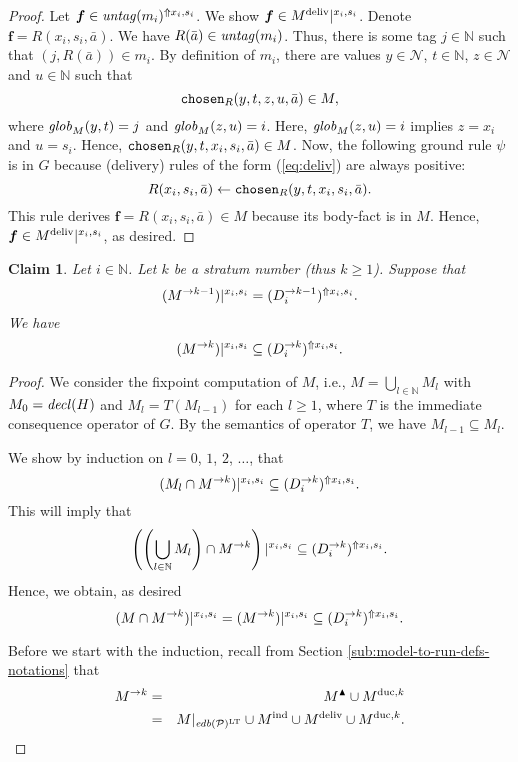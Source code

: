 \documentclass{tlp}
\newtheorem{claim}[theorem]{Claim}
\newcommand{\Nat}{\mathbb{N}}  \newcommand{\len}[1]{|#1|} \newcommand{\rom}[1]{\text{\emph{(#1)}}} \newcommand{\romI}{\rom i}
\newcommand{\ded}{\mathcal{P}}
\newcommand{\fc}{\boldsymbol{f}}
\newcommand{\proj}[2]{#1|_{#2}}
\newcommand{\edb}[1]{\fname{edb}(#1)}
\newcommand{\grl}{\psi}
\newcommand{\nw}{\mathcal{N}}
\newcommand{\sh}[1]{(#1)}
\newcommand{\toloct}[1]{#1^{\mathrm{LT}}}
\newcommand{\addlt}[3]{#1^{\Uparrow#2,#3}}
\newcommand{\projlt}[3]{#1|^{#2,#3}}
\newcommand{\shprojlt}[3]{\projlt{\sh{#1}}{#2}{#3}}
\newcommand{\shaddlt}[3]{\addlt{\sh{#1}}{#2}{#3}}
\newcommand{\chosen}{\pred{chosen}}
\newcommand{\decl}[1]{\fname{decl}(#1)}
\newcommand{\pair}[2]{(#1,#2)}
\newcommand{\untag}[1]{\fname{untag}(#1)}
\newcommand{\grded}{G}
\newcommand{\globM}[1]{\fname{glob}_{M}(#1)}
\begin{document}
\begin{appendix}
\begin{proof}
Let $\fc\in\addlt{\untag{m_{i}}}{x_{i}}{s_{i}}$. We show $\fc\in\projlt{\deliv M}{x_{i}}{s_{i}}$.
Denote $\fc=R(x_{i},s_{i},\bar{a})$. We have $R(\bar{a})\in\untag{m_{i}}$.
Thus, there is some tag $j\in\Nat$ such that $\pair j{R(\bar{a})}\in m_{i}$.
By definition of $m_{i}$, there are values $y\in\nw$, $t\in\Nat$,
$z\in\nw$ and $u\in\Nat$ such that 
\[
\chosen_{R}(y,t,z,u,\bar{a})\in M,
\]
where $\globM{y,t}=j$ and $\globM{z,u}=i$. Here, $\globM{z,u}=i$
implies $z=x_{i}$ and $u=s_{i}$. Hence, $\chosen_{R}(y,t,x_{i},s_{i},\bar{a})\in M$.
Now, the following ground rule $\grl$ is in $\grded$ because (delivery)
rules of the form (\ref{eq:deliv}) are always positive:
\[
R(x_{i},s_{i},\bar{a})\gets\chosen_{R}(y,t,x_{i},s_{i},\bar{a}).
\]
This rule derives $\fc=R(x_{i},s_{i},\bar{a})\in M$ because its body-fact
is in $M$. Hence, $\fc\in\projlt{\deliv M}{x_{i}}{s_{i}}$, as desired.\end{proof}



\tline



\begin{claim}\label{claim:strat-k-M-in-D}Let $i\in\Nat$. Let $k$
be a stratum number (thus $k\geq1$). Suppose that 
\[
\shprojlt{\strat M{k-1}}{x_{i}}{s_{i}}=\shaddlt{\strat{D_{i}}{k-1}}{x_{i}}{s_{i}}.
\]
We have 
\[
\shprojlt{\strat Mk}{x_{i}}{s_{i}}\subseteq\shaddlt{\strat{D_{i}}k}{x_{i}}{s_{i}}.
\]
\end{claim}

\begin{proof}

We consider the fixpoint computation of $M$, i.e., $M=\bigcup_{l\in\Nat}M_{l}$
with $M_{0}=\decl H$ and $M_{l}=T(M_{l-1})$ for each $l\geq1$,
where $T$ is the immediate consequence operator of $\grded$. By
the semantics of operator $T$, we have $M_{l-1}\subseteq M_{l}$. 

We show by induction on $l=0$, $1$, $2$, $\ldots$, that 
\[
\shprojlt{M_{l}\cap\strat Mk}{x_{i}}{s_{i}}\subseteq\shaddlt{\strat{D_{i}}k}{x_{i}}{s_{i}}.
\]
This will imply that 
\[
\projlt{\left(\left(\bigcup_{l\in\Nat}M_{l}\right)\cap\strat Mk\right)}{x_{i}}{s_{i}}\subseteq\shaddlt{\strat{D_{i}}k}{x_{i}}{s_{i}}.
\]
Hence, we obtain, as desired
\[
\shprojlt{M\cap\strat Mk}{x_{i}}{s_{i}}=\shprojlt{\strat Mk}{x_{i}}{s_{i}}\subseteq\shaddlt{\strat{D_{i}}k}{x_{i}}{s_{i}}.
\]


Before we start with the induction, recall from Section \ref{sub:model-to-run-defs-notations}
that 
\begin{eqnarray*}
\strat Mk & = & \up M\cup\duc Mk\\
 & = & \proj M{\toloct{\edb{\ded}}}\cup\ind M\cup\deliv M\cup\duc Mk.
\end{eqnarray*}




\end{proof}
\end{appendix}
\end{document}
